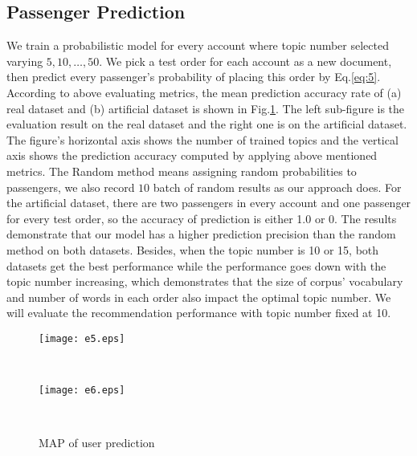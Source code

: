 \documentclass{llncs}
\begin{document}
\subsection{Passenger Prediction}
\label{sub:pred}
We train a probabilistic model for every account where topic number selected varying ${5,10,\dots,50}$. We pick a test order for each account as a new document, then predict every passenger's probability of placing this order by Eq.\ref{eq:5}. According to above evaluating metrics, the mean prediction accuracy rate of (a) real dataset and (b) artificial dataset is shown in Fig.\ref{fig:pred}. The left sub-figure is the evaluation result on the real dataset and the right one is on the artificial dataset. The figure's horizontal axis shows the number of trained topics and the vertical axis shows the prediction accuracy computed by applying above mentioned metrics. The Random method means assigning random probabilities to passengers, we also record $10$ batch of random results as our approach does. For the artificial dataset, there are two passengers in every account and one passenger for every test order, so the accuracy of prediction is either 1.0 or 0. The results demonstrate that our model has a higher prediction precision than the random method on both datasets. Besides, when the topic number is 10 or 15, both datasets get the best performance while the performance goes down with the topic number increasing, which demonstrates that the size of corpus' vocabulary and number of words in each order also impact the optimal topic number. We will evaluate the recommendation performance with topic number fixed at 10.\par 

\begin{figure}[!h]
              \begin{minipage}[t]{0.47\linewidth}
              \centering
              \texttt{[image: e5.eps]}\\
              \end{minipage}
              \begin{minipage}[t]{0.005\linewidth}~~~
              \end{minipage}
              \begin{minipage}[t]{0.47\linewidth}
              \centering
              \texttt{[image: e6.eps]}\\
              \end{minipage}
              \begin{minipage}[t]{0.005\linewidth}~~~
              \end{minipage}
              \caption{MAP of user prediction}
          \label{fig:pred}
\end{figure}
\end{document}

